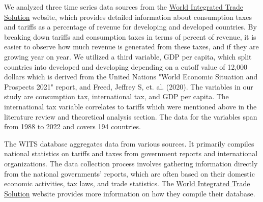 \documentclass[12pt]{article}
\begin{document}
We analyzed three time series data sources from the \href{https://wits.worldbank.org/CountryProfile/en/Country/BY-COUNTRY/StartYear/1988/EndYear/2022/Indicator/GC-TAX-GSRV-VA-ZS}{World Integrated Trade Solution} website, which provides detailed information about consumption taxes and tariffs as a percentage of revenue for developing and developed countries. By breaking down tariffs and consumption taxes in terms of percent of revenue, it is easier to observe how much revenue is generated from these taxes, and if they are growing year on year. We utilized a third variable, GDP per capita, which split countries into developed and developing depending on a cutoff value of 12,000 dollars which is derived from the United Nations "World Economic Situation and Prospects 2021" report, and Freed, Jeffrey S, et. al. (2020). The variables in our study are consumption tax, international tax, and GDP per capita. The international tax variable correlates to tariffs which were mentioned above in the literature review and theoretical analysis section. The data for the variables span from 1988 to 2022 and covers 194 countries. 

The WITS database aggregates data from various sources. It primarily compiles national statistics on tariffs and taxes from government reports and international organizations. The data collection process involves gathering information directly from the national governments' reports, which are often based on their domestic economic activities, tax laws, and trade statistics. The \href{https://wits.worldbank.org/CountryProfile/en/Country/BY-COUNTRY/StartYear/1988/EndYear/2022/Indicator/GC-TAX-GSRV-VA-ZS}{World Integrated Trade Solution} website provides more information on how they compile their database.
\end{document}
